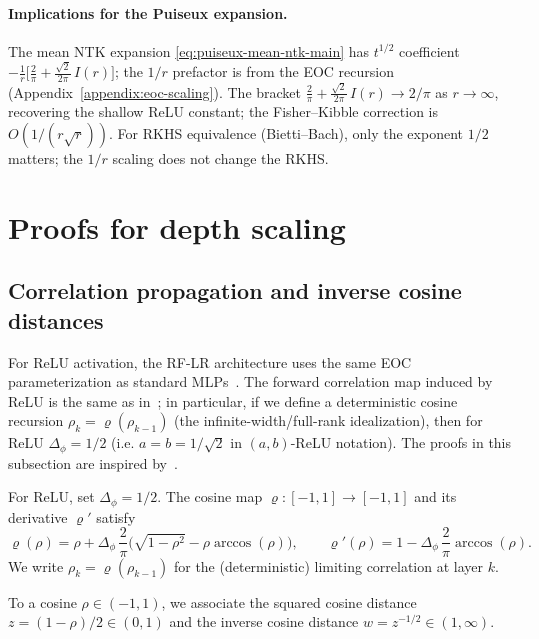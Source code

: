 \paragraph{Implications for the Puiseux expansion.}
The mean NTK expansion \eqref{eq:puiseux-mean-ntk-main} has \( t^{1/2} \) coefficient \( -\frac{1}{r}\big[\frac{2}{\pi}+\frac{\sqrt{2}}{2\pi}\,I(r)\big] \); the \( 1/r \) prefactor is from the EOC recursion (Appendix~\ref{appendix:eoc-scaling}). The bracket \( \frac{2}{\pi}+\frac{\sqrt{2}}{2\pi}\,I(r) \to 2/\pi \) as \( r\to\infty \), recovering the shallow ReLU constant; the Fisher--Kibble correction is \( O(1/(r\sqrt{r})) \). For RKHS equivalence (Bietti--Bach), only the exponent \( 1/2 \) matters; the \( 1/r \) scaling does not change the RKHS.
\section{Proofs for depth scaling}\label{appendix:depth-scaling-proofs}

\subsection{Correlation propagation and inverse cosine distances}\label{appendix:inverse-cosine-background}
For ReLU activation, the RF-LR architecture uses the same EOC parameterization as standard MLPs~\cite{hayou2018selectioninitializationactivationfunction}. The forward correlation map induced by ReLU is the same as in~\cite{terjek2025mlpsateoc}; in particular, if we define a deterministic cosine recursion \( \rho_k = \varrho(\rho_{k-1}) \) (the infinite-width/full-rank idealization), then for ReLU \( \Delta_\phi = 1/2 \) (i.e. \( a = b = 1/\sqrt{2} \) in \( (a,b) \)-ReLU notation). The proofs in this subsection are inspired by~\cite{terjek2025mlpsateoc}.

\begin{definition}
For ReLU, set \( \Delta_\phi = 1/2 \). The cosine map \( \varrho : [-1,1] \to [-1,1] \) and its derivative \( \varrho' \) satisfy
\[
\varrho(\rho) = \rho + \Delta_\phi\,\frac{2}{\pi}\bigl( \sqrt{1-\rho^2} - \rho\arccos(\rho) \bigr),\qquad
\varrho'(\rho) = 1 - \Delta_\phi\,\frac{2}{\pi}\arccos(\rho).
\]
We write \( \rho_k = \varrho(\rho_{k-1}) \) for the (deterministic) limiting correlation at layer \( k \).
\end{definition}

To a cosine \( \rho \in (-1,1) \), we associate the squared cosine distance \( z = (1-\rho)/2 \in (0,1) \) and the inverse cosine distance \( w = z^{-1/2} \in (1,\infty) \).

